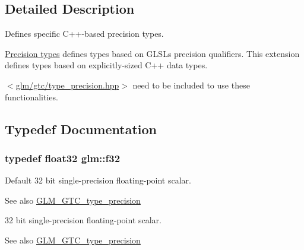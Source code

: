 \subsection{Detailed Description}
Defines specific C++-\/based precision types. 

\hyperlink{group__core__precision}{Precision types} defines types based on G\+L\+S\+L\textquotesingle{}s precision qualifiers. This extension defines types based on explicitly-\/sized C++ data types.

$<$\hyperlink{type__precision_8hpp}{glm/gtc/type\+\_\+precision.\+hpp}$>$ need to be included to use these functionalities. 

\subsection{Typedef Documentation}
\hypertarget{group__gtc__type__precision_ga0ec999b57f5330d9021256e96038df04}{}
\subsubsection[{f32}]{\setlength{\rightskip}{0pt plus 5cm}typedef float32 {\bf glm\+::f32}}\label{group__gtc__type__precision_ga0ec999b57f5330d9021256e96038df04}
Default 32 bit single-\/precision floating-\/point scalar. \begin{DoxySeeAlso}{See also}
\hyperlink{group__gtc__type__precision}{G\+L\+M\+\_\+\+G\+T\+C\+\_\+type\+\_\+precision}
\end{DoxySeeAlso}
32 bit single-\/precision floating-\/point scalar. \begin{DoxySeeAlso}{See also}
\hyperlink{group__gtc__type__precision}{G\+L\+M\+\_\+\+G\+T\+C\+\_\+type\+\_\+precision} 
\end{DoxySeeAlso}
\hypertarget{group__gtc__type__precision_ga29b40a1141234160a627a540eceedd31}{}
